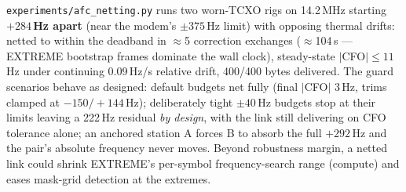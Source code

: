 \texttt{experiments/afc\_netting.py} runs two worn-TCXO rigs on
14.2\,MHz starting \textbf{$+284$\,Hz apart} (near the modem's
$\pm 375$\,Hz limit) with opposing thermal drifts: netted to within
the deadband in $\approx$5 correction exchanges ($\approx$104\,s ---
EXTREME bootstrap frames dominate the wall clock), steady-state
$|$CFO$| \le 11$\,Hz under continuing 0.09\,Hz/s relative drift,
400/400 bytes delivered.  The guard scenarios behave as designed:
default budgets net fully (final $|$CFO$|$ 3\,Hz, trims clamped at
$-150/+144$\,Hz); deliberately tight $\pm 40$\,Hz budgets stop at
their limits leaving a 222\,Hz residual \emph{by design}, with the
link still delivering on CFO tolerance alone; an anchored station A
forces B to absorb the full $+292$\,Hz and the pair's absolute
frequency never moves.  Beyond robustness margin, a netted link could
shrink EXTREME's per-symbol frequency-search range (compute) and eases
mask-grid detection at the extremes.
